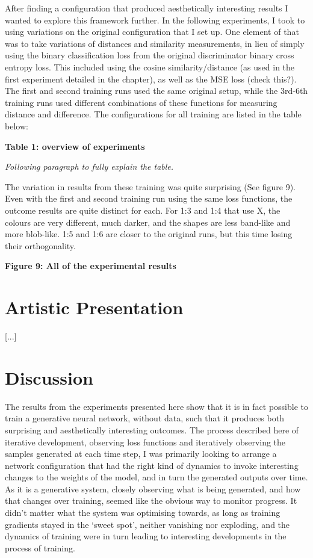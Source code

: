 After finding a configuration that produced aesthetically interesting results I wanted to explore this framework further. 
In the following experiments, I took to using variations on the original configuration that I set up. 
One element of that was to take variations of distances and similarity measurements, in lieu of simply using the binary classification loss from the original discriminator binary cross entropy loss. 
This included using the cosine similarity/distance (as used in the first experiment detailed in the chapter), as well as the MSE loss (check this?). 
The first and second training runs used the same original setup, while the 3rd-6th training runs used different combinations of these functions for measuring distance and difference. 
The configurations for all training are listed in the table below:

\textbf{Table 1: overview of experiments}

\textit{Following paragraph to fully explain the table.}

The variation in results from these training was quite surprising (See figure 9). 
Even with the first and second training run using the same loss functions, the outcome results are quite distinct for each. 
For 1:3 and 1:4 that use X, the colours are very different, much darker, and the shapes are less band-like and more blob-like. 
1:5 and 1:6 are closer to the original runs, but this time losing their orthogonality. 

\textbf{Figure 9: All of the experimental results}

\section{Artistic Presentation}

[...]

\section{Discussion}

The results from the experiments presented here show that it is in fact possible to train a generative neural network, without data, such that it produces both surprising and aesthetically interesting outcomes. 
The process described here of iterative development, observing loss functions and iteratively observing the samples generated at each time step, I was primarily looking to arrange a network configuration that had the right kind of dynamics to invoke interesting changes to the weights of the model, and in turn the generated outputs over time. 
As it is a generative system, closely observing what is being generated, and how that changes over training, seemed like the obvious way to monitor progress. 
It didn’t matter what the system was optimising towards, as long as training gradients stayed in the `sweet spot’, neither vanishing nor exploding, and the dynamics of training were in turn leading to interesting developments in the process of training. 

